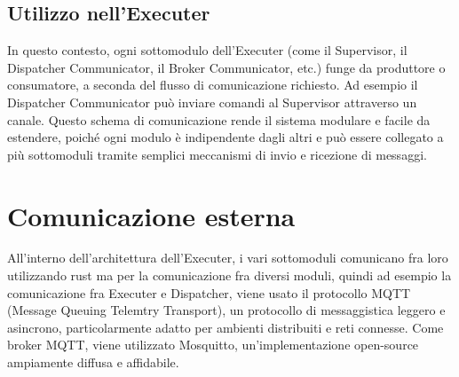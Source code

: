 \documentclass[target=bach,aauheader=,style=]{thud}
\begin{document}
\subsection{Utilizzo nell'Executer}
In questo contesto, ogni sottomodulo dell'Executer (come il Supervisor, il Dispatcher Communicator, il Broker Communicator, etc.) funge da produttore o consumatore, a seconda del flusso di comunicazione richiesto. Ad esempio il Dispatcher Communicator può inviare comandi al Supervisor attraverso un canale.
\newline
Questo schema di comunicazione rende il sistema modulare e facile da estendere, poiché ogni modulo è indipendente dagli altri e può essere collegato a più sottomoduli tramite semplici meccanismi di invio e ricezione di messaggi.

\section{Comunicazione esterna}
All'interno dell'architettura dell'Executer, i vari sottomoduli comunicano fra loro utilizzando rust ma per la comunicazione fra diversi moduli, quindi ad esempio la comunicazione fra Executer e Dispatcher, viene usato il protocollo MQTT (Message Queuing Telemtry Transport), un protocollo di messaggistica leggero e asincrono, particolarmente adatto per ambienti distribuiti e reti connesse. Come broker MQTT, viene utilizzato Mosquitto, un'implementazione open-source ampiamente diffusa e affidabile. 
\end{document}
